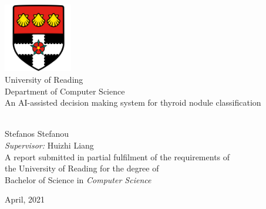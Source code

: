 \documentclass[a4paper,11pt,oneside]{book}
\begin{document}
    
    \frontmatter
          
    \begin{titlepage}      
        \begin{center}
            \includegraphics[width=3cm]{figures/uorlogo.png}\\[0.5cm]
            {\LARGE University of Reading\\[0.5cm]
                Department of Computer Science}\\[2cm]
            
            
            \linespread{1.2}\huge {An AI-assisted decision making system for thyroid nodule classification}
            
            
            \linespread{1}~\\[2cm]
            
            {\Large Stefanos Stefanou}\\[1cm] 
            
            {\large \emph{Supervisor:} Huizhi Liang}\\[1cm] %
            
            \large A report submitted in partial fulfilment of the requirements of\\the University of Reading for the degree of\\ Bachelor of Science in \textit{Computer Science}\\[0.3cm] 
            \vfill
            
            
            April, 2021%
        \end{center}
    \end{titlepage}
\end{document}
